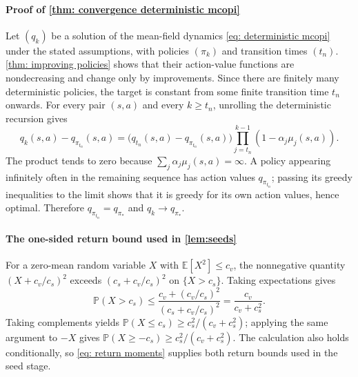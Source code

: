 \documentclass[twoside,11pt]{article}
\DeclareRobustCommand{\reviewbarstart}{%
  \ifhmode %
    \vadjust{\vbox to 0pt{%
      \vskip-\ht\strutbox %
      \vskip-\dp\strutbox %
      \cbstart[\changebarwidth] %
      \vss %
    }}%
  \else %
    \cbstart[\changebarwidth]%
  \fi %
} %
\providecommand{\DIFadd}[1]{#1} %
\providecommand{\DIFaddbegin}{\reviewbarstart} %
\providecommand{\DIFaddend}{\protect\cbend} %
\def\DIFadd#1{#1}%
\def\DIFaddbegin{}%
\def\DIFaddend{}%
\begin{document}
 \DIFaddbegin \paragraph{\DIFadd{Proof of \autoref{thm: convergence deterministic mcopi}}}
\DIFadd{Let $(q_k)$ be a solution of the mean-field dynamics \eqref{eq: deterministic mcopi} under the stated assumptions, with policies $(\pi_k)$ and transition times $(t_n)$.
\autoref{thm: improving policies} shows that their action-value functions are nondecreasing and change only by improvements. Since there are finitely many deterministic policies, the target is constant from some finite transition time $t_n$ onwards.
For every pair $(s,a)$ and every $k\ge t_n$, unrolling the deterministic recursion gives
}\[
\DIFadd{q_k(s,a)-q_{\pi_{t_n}}(s,a)
=\big(q_{t_n}(s,a)-q_{\pi_{t_n}}(s,a)\big)
\prod_{j=t_n}^{k-1}(1-\alpha_j\mu_j(s,a)).
}\]
\DIFadd{The product tends to zero because $\sum_j\alpha_j\mu_j(s,a)=\infty$.
A policy appearing infinitely often in the remaining sequence has action values $q_{\pi_{t_n}}$; passing its greedy inequalities to the limit shows that it is greedy for its own action values, hence optimal. Therefore $q_{\pi_{t_n}}=q_{\pi_*}$ and $q_k\to q_{\pi_*}$.
}\DIFaddend \hfill\BlackBox

\DIFaddbegin \paragraph{\DIFadd{The one-sided return bound used in \autoref{lem:seeds}}}
\DIFadd{For a zero-mean random variable $X$ with $\mathbb E[X^2]\le c_v$, the nonnegative quantity $(X+c_v/c_s)^2$ exceeds $(c_s+c_v/c_s)^2$ on $\{X>c_s\}$. Taking expectations gives
}\[
\DIFadd{\mathbb P(X>c_s)
\le\frac{c_v+(c_v/c_s)^2}{(c_s+c_v/c_s)^2}
=\frac{c_v}{c_v+c_s^2}.
}\]
\DIFadd{Taking complements yields $\mathbb P(X\le c_s)\ge c_s^2/(c_v+c_s^2)$; applying the same argument to $-X$ gives $\mathbb P(X\ge-c_s)\ge c_s^2/(c_v+c_s^2)$. The calculation also holds conditionally, so \eqref{eq: return moments} supplies both return bounds used in the seed stage.
}\DIFaddend 
\end{document}
